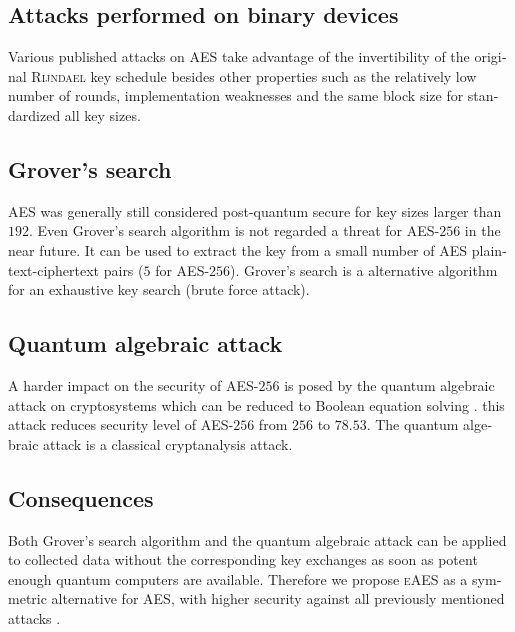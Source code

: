 \documentclass[a4paper,11pt]{article}
\begin{document}
\begin{otherlanguage}{english}
\subsection{Attacks performed on binary devices}
\noindent
Various published attacks on \textsc{AES} \cite{HFE, WEI, CRK} take advantage of the invertibility of the original \textsc{Rijndael} key schedule besides other properties such as the relatively low number of rounds, implementation weaknesses and the same block size for standardized all key sizes.

\subsection{Grover's search}
\noindent
\textsc{AES} was generally still considered post-quantum secure for key sizes larger than $192$. Even Grover’s search algorithm \cite{GRV} is not regarded a threat for \textsc{AES}-$256$ in the near future. It can be used to extract the key from a small number of \textsc{AES} plaintext-ciphertext pairs ($5$ for \textsc{AES}-$256$). Grover's search is a alternative algorithm for an exhaustive key search (brute force attack).

\subsection{Quantum algebraic attack}
\noindent
A harder impact on the security of \textsc{AES}-$256$ is posed by the quantum algebraic attack on cryptosystems which can be reduced to Boolean equation solving \cite{QAA}. this attack reduces security level of \textsc{AES}-$256$ from $256$ to $78.53$. The quantum algebraic attack is a classical cryptanalysis attack.

\subsection{Consequences}
\noindent
Both Grover's search algorithm and the quantum algebraic attack can be applied to collected data without the corresponding key exchanges as soon as potent enough quantum computers are available. Therefore we propose \textsc{eAES} as a symmetric alternative for \textsc{AES}, with higher security against all previously mentioned attacks \cite{HFE,WEI,CRK,GRO,QAA}.\\



\end{otherlanguage}
\end{document}
